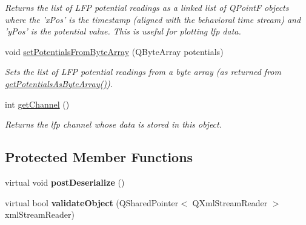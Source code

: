 \begin{DoxyCompactItemize}
\begin{DoxyCompactList}\small\item\em Returns the list of L\-F\-P potential readings as a linked list of Q\-Point\-F objects where the 'x\-Pos' is the timestamp (aligned with the behavioral time stream) and 'y\-Pos' is the potential value. This is useful for plotting lfp data. \end{DoxyCompactList}\item 
\hypertarget{class_picto_1_1_l_f_p_data_unit_package_a4ab7fffb2ec8a5916eb0e59c14b1361b}{void \hyperlink{class_picto_1_1_l_f_p_data_unit_package_a4ab7fffb2ec8a5916eb0e59c14b1361b}{set\-Potentials\-From\-Byte\-Array} (Q\-Byte\-Array potentials)}\label{class_picto_1_1_l_f_p_data_unit_package_a4ab7fffb2ec8a5916eb0e59c14b1361b}

\begin{DoxyCompactList}\small\item\em Sets the list of L\-F\-P potential readings from a byte array (as returned from \hyperlink{class_picto_1_1_l_f_p_data_unit_package_a65b72eec9a8d87fdf401e6955170d17c}{get\-Potentials\-As\-Byte\-Array()}). \end{DoxyCompactList}\item 
\hypertarget{class_picto_1_1_l_f_p_data_unit_package_a464bcb416a91366cd37a29a4b81f40ff}{int \hyperlink{class_picto_1_1_l_f_p_data_unit_package_a464bcb416a91366cd37a29a4b81f40ff}{get\-Channel} ()}\label{class_picto_1_1_l_f_p_data_unit_package_a464bcb416a91366cd37a29a4b81f40ff}

\begin{DoxyCompactList}\small\item\em Returns the lfp channel whose data is stored in this object. \end{DoxyCompactList}\end{DoxyCompactItemize}
\subsection*{Protected Member Functions}
\begin{DoxyCompactItemize}
\item 
\hypertarget{class_picto_1_1_l_f_p_data_unit_package_a202f8699cac37f072e8616f67d81db4b}{virtual void {\bfseries post\-Deserialize} ()}\label{class_picto_1_1_l_f_p_data_unit_package_a202f8699cac37f072e8616f67d81db4b}

\item 
\hypertarget{class_picto_1_1_l_f_p_data_unit_package_a14b5e30d69198608af2170385b4b6f39}{virtual bool {\bfseries validate\-Object} (Q\-Shared\-Pointer$<$ Q\-Xml\-Stream\-Reader $>$ xml\-Stream\-Reader)}\label{class_picto_1_1_l_f_p_data_unit_package_a14b5e30d69198608af2170385b4b6f39}

\end{DoxyCompactItemize}
